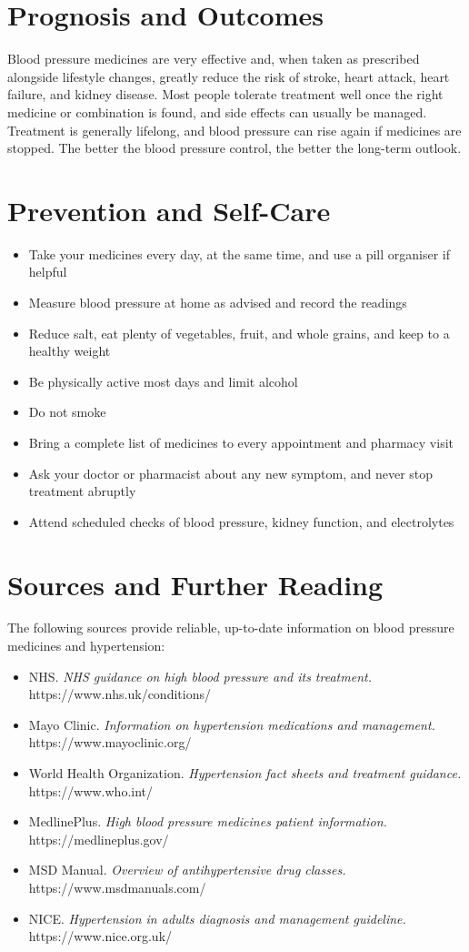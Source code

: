 \section*{Prognosis and Outcomes}
Blood pressure medicines are very effective and, when taken as prescribed alongside lifestyle changes, greatly reduce the risk of stroke, heart attack, heart failure, and kidney disease. Most people tolerate treatment well once the right medicine or combination is found, and side effects can usually be managed. Treatment is generally lifelong, and blood pressure can rise again if medicines are stopped. The better the blood pressure control, the better the long-term outlook.

\section*{Prevention and Self-Care}
\begin{itemize}
    \item Take your medicines every day, at the same time, and use a pill organiser if helpful
    \item Measure blood pressure at home as advised and record the readings
    \item Reduce salt, eat plenty of vegetables, fruit, and whole grains, and keep to a healthy weight
    \item Be physically active most days and limit alcohol
    \item Do not smoke
    \item Bring a complete list of medicines to every appointment and pharmacy visit
    \item Ask your doctor or pharmacist about any new symptom, and never stop treatment abruptly
    \item Attend scheduled checks of blood pressure, kidney function, and electrolytes
\end{itemize}

\section*{Sources and Further Reading}
The following sources provide reliable, up-to-date information on blood pressure medicines and hypertension:

\begin{itemize}
    \item NHS. \textit{NHS guidance on high blood pressure and its treatment.} https://www.nhs.uk/conditions/
    \item Mayo Clinic. \textit{Information on hypertension medications and management.} https://www.mayoclinic.org/
    \item World Health Organization. \textit{Hypertension fact sheets and treatment guidance.} https://www.who.int/
    \item MedlinePlus. \textit{High blood pressure medicines patient information.} https://medlineplus.gov/
    \item MSD Manual. \textit{Overview of antihypertensive drug classes.} https://www.msdmanuals.com/
    \item NICE. \textit{Hypertension in adults diagnosis and management guideline.} https://www.nice.org.uk/
\end{itemize}
